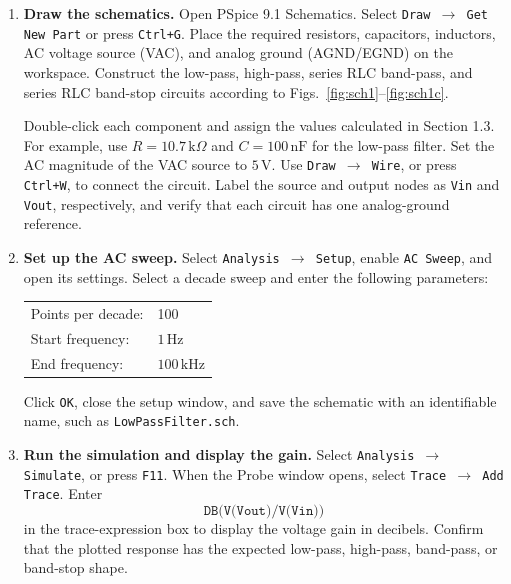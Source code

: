 \documentclass[12pt,a4paper]{article}
\begin{document}
	\begin{enumerate}[leftmargin=0.8cm,label=\textbf{Step \arabic*:},itemsep=0.55em]
		\item \textbf{Draw the schematics.}
		Open PSpice 9.1 Schematics. Select \texttt{Draw $\rightarrow$ Get New Part} or press \texttt{Ctrl+G}. Place the required resistors, capacitors, inductors, AC voltage source (VAC), and analog ground (AGND/EGND) on the workspace. Construct the low-pass, high-pass, series RLC band-pass, and series RLC band-stop circuits according to Figs.~\ref{fig:sch1}--\ref{fig:sch1c}.
		
		Double-click each component and assign the values calculated in Section 1.3. For example, use $R=10.7\,\mathrm{k}\Omega$ and $C=100\,\mathrm{n}\mathrm{F}$ for the low-pass filter. Set the AC magnitude of the VAC source to $5\,\mathrm{V}$. Use \texttt{Draw $\rightarrow$ Wire}, or press \texttt{Ctrl+W}, to connect the circuit. Label the source and output nodes as \texttt{Vin} and \texttt{Vout}, respectively, and verify that each circuit has one analog-ground reference.
		
		\item \textbf{Set up the AC sweep.}
		Select \texttt{Analysis $\rightarrow$ Setup}, enable \texttt{AC Sweep}, and open its settings. Select a decade sweep and enter the following parameters:
		\begin{center}
			\begin{tabular}{@{}ll@{}}
				Points per decade: & 100 \\
				Start frequency: & $1\,\mathrm{Hz}$ \\
				End frequency: & $100\,\mathrm{kHz}$
			\end{tabular}
		\end{center}
		Click \texttt{OK}, close the setup window, and save the schematic with an identifiable name, such as \texttt{LowPassFilter.sch}.
		
		\item \textbf{Run the simulation and display the gain.}
		Select \texttt{Analysis $\rightarrow$ Simulate}, or press \texttt{F11}. When the Probe window opens, select \texttt{Trace $\rightarrow$ Add Trace}. Enter
		\begin{equation}
			\texttt{DB(V(Vout)/V(Vin))}
			\label{eq:pspice-db-trace}
		\end{equation}
		in the trace-expression box to display the voltage gain in decibels. Confirm that the plotted response has the expected low-pass, high-pass, band-pass, or band-stop shape.
		

\end{enumerate}
\end{document}
